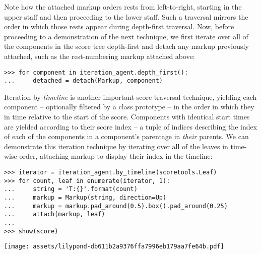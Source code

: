 \noindent Note how the attached markup orders rests from left-to-right,
starting in the upper staff and then proceeding to the lower staff. Such a
traversal mirrors the order in which those rests appear during depth-first
traversal. Now, before proceeding to a demonstration of the next technique, we
first iterate over all of the components in the score tree depth-first and
detach any markup previously attached, such as the rest-numbering markup
attached above:

\begin{comment}
<abjad>
for component in iteration_agent.depth_first():
    detached = detach(Markup, component)
</abjad>
\end{comment}

\begin{abjadbookoutput}
\begin{singlespacing}
\vspace{-0.5\baselineskip}
\begin{verbatim}
>>> for component in iteration_agent.depth_first():
...     detached = detach(Markup, component)
\end{verbatim}
\end{singlespacing}
\end{abjadbookoutput}

\noindent Iteration by \emph{timeline} is another important score traversal
technique, yielding each component -- optionally filtered by a class prototype
-- in the order in which they in time relative to the start of the score.
Components with identical start times are yielded according to their score
index -- a tuple of indices describing the index of each of the components in a
component's parentage in \emph{their} parents. We can demonstrate this
iteration technique by iterating over all of the leaves in time-wise order,
attaching markup to display their index in the timeline:

\begin{comment}
<abjad>
iterator = iteration_agent.by_timeline(scoretools.Leaf)
for count, leaf in enumerate(iterator, 1):
    string = 'T:{}'.format(count)
    markup = Markup(string, direction=Up)
    markup = markup.pad_around(0.5).box().pad_around(0.25)
    attach(markup, leaf)

show(score)
</abjad>
\end{comment}

\begin{abjadbookoutput}
\begin{singlespacing}
\vspace{-0.5\baselineskip}
\begin{verbatim}
>>> iterator = iteration_agent.by_timeline(scoretools.Leaf)
>>> for count, leaf in enumerate(iterator, 1):
...     string = 'T:{}'.format(count)
...     markup = Markup(string, direction=Up)
...     markup = markup.pad_around(0.5).box().pad_around(0.25)
...     attach(markup, leaf)
...
>>> show(score)
\end{verbatim}
\noindent\texttt{[image: assets/lilypond-db611b2a9376ffa7996eb179aa7fe64b.pdf]}
\end{singlespacing}
\end{abjadbookoutput}

